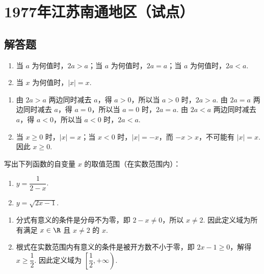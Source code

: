 \chapter{1977年江苏南通地区（试点）}

\section{解答题}

\begin{problem}
\begin{enumerate}
\item
当 \(a\) 为何值时，\(2a>a\)；当 \(a\) 为何值时，\(2a=a\)；当 \(a\) 为何值时，\(2a<a\).

\item
当 \(x\) 为何值时，\(|x|=x\).
\end{enumerate}
\end{problem}

\begin{solution}
\begin{enumerate}
\item 由 \(2a>a\) 两边同时减去 \(a\)，得 \(a>0\)，所以当 \(a>0\) 时，\(2a>a\). 由 \(2a=a\) 两边同时减去 \(a\)，得 \(a=0\)，所以当 \(a=0\) 时，\(2a=a\). 由 \(2a<a\) 两边同时减去 \(a\)，得 \(a<0\)，所以当 \(a<0\) 时，\(2a<a\).

\item 当 \(x\geqslant0\) 时，\(|x|=x\)；当 \(x<0\) 时，\(|x|=-x\)，而 \(-x>x\)，不可能有 \(|x|=x\). 因此 \(x\geqslant0\).
\end{enumerate}
\end{solution}

\begin{problem}
写出下列函数的自变量 \(x\) 的取值范围（在实数范围内）：

\begin{enumerate}
\item \(y=\dfrac{1}{2-x}\).
\item \(y=\sqrt{2x-1}\).
\end{enumerate}
\end{problem}

\begin{solution}
\begin{enumerate}
\item 分式有意义的条件是分母不为零，即 \(2-x\neq0\)，所以 \(x\neq2\). 因此定义域为所有满足 \(x\in\R\) 且 \(x\neq2\) 的 \(x\).

\item 根式在实数范围内有意义的条件是被开方数不小于零，即 \(2x-1\geqslant0\)，解得 \(x\geqslant\dfrac12\). 因此定义域为 \(\left[\dfrac12,+\infty\right)\).
\end{enumerate}
\end{solution}

